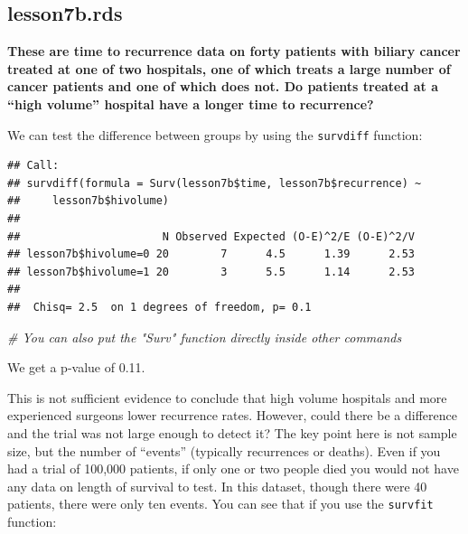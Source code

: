 \documentclass[]{book}
\newenvironment{Shaded}{\begin{snugshade}}{\end{snugshade}}
\newcommand{\CommentTok}[1]{\textcolor[rgb]{0.56,0.35,0.01}{\textit{#1}}}
\newcommand{\KeywordTok}[1]{\textcolor[rgb]{0.13,0.29,0.53}{\textbf{#1}}}
\newcommand{\NormalTok}[1]{#1}
\newcommand{\OperatorTok}[1]{\textcolor[rgb]{0.81,0.36,0.00}{\textbf{#1}}}
\newcommand{\StringTok}[1]{\textcolor[rgb]{0.31,0.60,0.02}{#1}}
\begin{document}
\hypertarget{lesson7b.rds}{%
\subsection{lesson7b.rds}\label{lesson7b.rds}}

\textbf{These are time to recurrence data on forty patients with biliary cancer treated at one of two hospitals, one of which treats a large number of cancer patients and one of which does not. Do patients treated at a ``high volume'' hospital have a longer time to recurrence?}

We can test the difference between groups by using the \texttt{survdiff} function:

\begin{Shaded}
\end{Shaded}

\begin{verbatim}
## Call:
## survdiff(formula = Surv(lesson7b$time, lesson7b$recurrence) ~ 
##     lesson7b$hivolume)
## 
##                      N Observed Expected (O-E)^2/E (O-E)^2/V
## lesson7b$hivolume=0 20        7      4.5      1.39      2.53
## lesson7b$hivolume=1 20        3      5.5      1.14      2.53
## 
##  Chisq= 2.5  on 1 degrees of freedom, p= 0.1
\end{verbatim}

\begin{Shaded}
\begin{Highlighting}[]
\CommentTok{# You can also put the "Surv" function directly inside other commands}
\end{Highlighting}
\end{Shaded}

We get a p-value of 0.11.

This is not sufficient evidence to conclude that high volume hospitals and more experienced surgeons lower recurrence rates. However, could there be a difference and the trial was not large enough to detect it? The key point here is not sample size, but the number of ``events'' (typically recurrences or deaths). Even if you had a trial of 100,000 patients, if only one or two people died you would not have any data on length of survival to test. In this dataset, though there were 40 patients, there were only ten events. You can see that if you use the \texttt{survfit} function:
\end{document}
